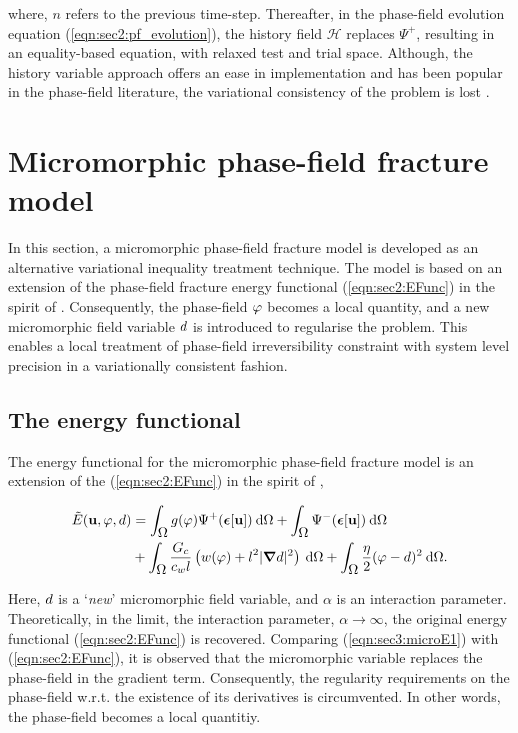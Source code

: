\documentclass[11pt]{article}
\begin{document}
where, $n$ refers to the previous time-step. Thereafter, in the phase-field evolution equation (\ref{eqn:sec2:pf_evolution}), the history field $\mathcal{H}$ replaces $\Psi^+$, resulting in an equality-based equation, with relaxed test and trial space. Although, the history variable approach offers an ease in implementation and has been popular in the phase-field literature, the variational consistency of the problem is lost \cite{de2020numerical}. 

\section{Micromorphic phase-field fracture model}\label{sec3}

In this section, a micromorphic phase-field fracture model is developed as an alternative variational inequality treatment technique. The model is based on an extension of the phase-field fracture energy functional (\ref{eqn:sec2:EFunc}) in the spirit of \cite{forest2009micromorphic}. Consequently, the phase-field $\hbox{$\varphi$}$ becomes a local quantity, and a new micromorphic field variable $\hbox{$d$}$ is introduced to regularise the problem. This enables a local treatment of phase-field irreversibility constraint with system level precision in a variationally consistent fashion.

\subsection{The energy functional}

The energy functional for the micromorphic phase-field fracture model is an extension of the (\ref{eqn:sec2:EFunc}) in the spirit of \cite{forest2009micromorphic}, 

\begin{align}
\Tilde{E}(\hbox{$\mathbf{u}$},\hbox{$\varphi$},\hbox{$d$}) & = \int_{\hbox{$\Omega$}}^{} g(\hbox{$\varphi$}) \Psi^+(\hbox{$\hbox{\boldmath$\epsilon$}$}[\hbox{$\mathbf{u}$}]) \: \text{d}\hbox{$\Omega$} + \int_{\hbox{$\Omega$}}^{} \Psi^-(\hbox{$\hbox{\boldmath$\epsilon$}$}[\hbox{$\mathbf{u}$}]) \: \text{d}\hbox{$\Omega$}  {\label{eqn:sec3:microE1}} \\ 
& + \int_{\hbox{$\Omega$}}^{} \dfrac{\hbox{$G_c$}}{c_w \hbox{$l$}} \left( w(\hbox{$\varphi$}) + \hbox{$l$}^2 |\hbox{\boldmath$\nabla$} \hbox{$d$}|^2 \right) \: \text{d}\hbox{$\Omega$} + \int_{\hbox{$\Omega$}}^{} \frac{\eta}{2} (\hbox{$\varphi$}-\hbox{$d$})^2 \: \text{d}\hbox{$\Omega$}. \nonumber
\end{align}

Here, $\hbox{$d$}$ is a `\textit{new}' micromorphic field variable, and $\alpha$ is an interaction parameter. Theoretically, in the limit, the interaction parameter, $\alpha \rightarrow \infty$, the original energy functional (\ref{eqn:sec2:EFunc}) is recovered. Comparing (\ref{eqn:sec3:microE1}) with (\ref{eqn:sec2:EFunc}), it is observed that the micromorphic variable replaces the phase-field in the gradient term. Consequently, the regularity requirements on the phase-field w.r.t. the existence of its derivatives is circumvented. In other words, the phase-field becomes a local quantitiy.
\end{document}
